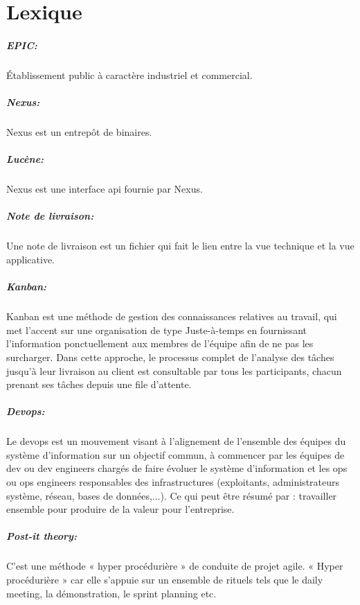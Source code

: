 \chapter*{Lexique}
\label{chap:Lexique}

\paragraph{EPIC: }
\label{lexi:epic}
Établissement public à caractère industriel et commercial.

\paragraph{Nexus: }
\label{lexi:nexus}
Nexus est un entrepôt de binaires.

\paragraph{Lucène: }
\label{lexi:lucene}
Nexus est une interface api fournie par Nexus.

\paragraph{Note de livraison: }
\label{lexi:delivery_note}
Une note de livraison est un fichier qui fait le lien entre la vue technique et la vue applicative.

\paragraph{Kanban: }
\label{lexi:kanban}
Kanban est une méthode de gestion des connaissances relatives au travail,
qui met l’accent sur une organisation de type Juste-à-temps en fournissant l'information ponctuellement aux membres de l'équipe afin de ne pas les surcharger.
Dans cette approche, le processus complet de l'analyse des tâches jusqu’à leur livraison au client est consultable par tous les participants,
chacun prenant ses tâches depuis une file d'attente.

\paragraph{Devops: }
\label{lexi:devops}
Le devops est un mouvement visant à l'alignement de l'ensemble des équipes du système d'information sur un objectif commun,
à commencer par les équipes de dev ou dev engineers chargés de faire évoluer le système d'information et les ops ou ops engineers responsables des infrastructures (exploitants, administrateurs système, réseau, bases de données,...).
Ce qui peut être résumé par : travailler ensemble pour produire de la valeur pour l'entreprise.

\paragraph{Post-it theory: }
\label{lexi:post_it_theory}
C’est une méthode « hyper procédurière » de conduite de projet agile.
« Hyper procédurière » car elle s’appuie sur un ensemble de rituels tels que le daily meeting, la démonstration, le sprint planning etc.
